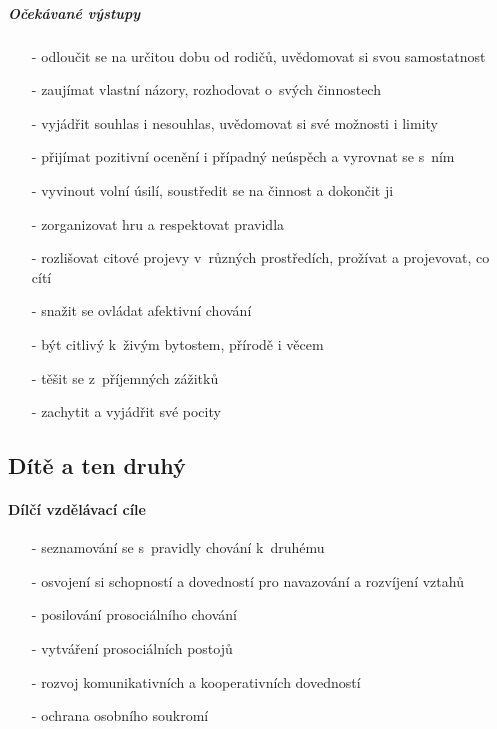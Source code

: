 					\subparagraph{Očekávané výstupy}

					\begin{itemize}
					\setlength\itemsep{-2mm}
						\item[-]odloučit se na určitou dobu od rodičů, uvědomovat si svou samostatnost
						\item[-]zaujímat vlastní názory, rozhodovat o~svých činnostech
						\item[-]vyjádřit souhlas i nesouhlas, uvědomovat si své možnosti i limity
						\item[-]přijímat pozitivní ocenění i případný neúspěch a vyrovnat se s~ním
						\item[-]vyvinout volní úsilí, soustředit se na činnost a dokončit ji
						\item[-]zorganizovat hru a respektovat pravidla
						\item[-]rozlišovat citové projevy v~různých prostředích, prožívat a projevovat, co cítí
						\item[-]snažit se ovládat afektivní chování
						\item[-]být citlivý k~živým bytostem, přírodě i věcem
						\item[-]těšit se z~příjemných zážitků
						\item[-]zachytit a vyjádřit své pocity
					\end{itemize}

			\subsection{Dítě a ten druhý}
				\textit{} \citep[s.~24]{RVP}

					\paragraph{Dílčí vzdělávací cíle}

					\begin{itemize}
					\setlength\itemsep{-2mm}
						\item[-]seznamování se s~pravidly chování k~druhému
						\item[-]osvojení si schopností a dovedností pro navazování a rozvíjení vztahů
						\item[-]posilování prosociálního chování
						\item[-]vytváření prosociálních postojů
						\item[-]rozvoj komunikativních a kooperativních dovedností
						\item[-]ochrana osobního soukromí
					\end{itemize}
					
